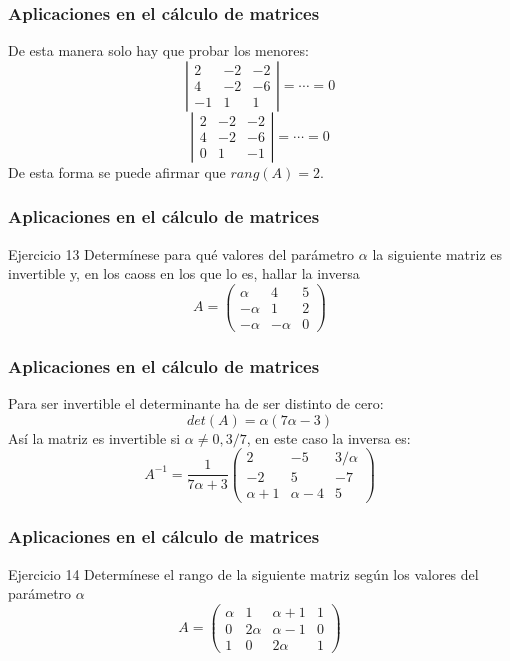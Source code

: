 \documentclass[12pt]{article}
\begin{document}
   \begin{frame}
  \frametitle{Aplicaciones en el c\'alculo de matrices}
De esta manera solo hay que probar los menores:
\[\left|\begin{array}{ccc}2 & -2 & -2 \\4 & -2 & -6 \\-1 & 1 & 1\end{array}\right|=\cdots=0\]
\[\left|\begin{array}{ccc}2 & -2 & -2 \\4 & -2 & -6 \\0 & 1 & -1\end{array}\right|=\cdots=0\]
De esta forma se puede afirmar que $rang(A) = 2$.
\end{frame}  


     \begin{frame}
  \frametitle{Aplicaciones en el c\'alculo de matrices}
     \begin{block}{Ejercicio 13}
Determ\'inese para qu\'e valores del par\'ametro $\alpha$ la siguiente matriz es invertible y, en los caoss en los que lo es, hallar la inversa
\[A = \left(\begin{array}{ccc} \alpha & 4 & 5 \\ -\alpha & 1 & 2 \\ -\alpha & -\alpha & 0 \end{array}\right)\]
\end{block}
\end{frame} 



     \begin{frame}
  \frametitle{Aplicaciones en el c\'alculo de matrices}
Para ser invertible el determinante ha de ser distinto de cero:
\[det(A) = \alpha(7\alpha-3)\]
As\'i la matriz es invertible si $\alpha \neq 0, 3/7$,  en este caso la inversa es: 
\[A^{-1} = \frac{1}{7\alpha+3} \left(\begin{array}{ccc} 2 & -5 & 3/\alpha \\ -2 & 5 & -7 \\ \alpha+1 & \alpha-4 & 5 \end{array}\right) \]
\end{frame} 


     \begin{frame}
  \frametitle{Aplicaciones en el c\'alculo de matrices}
     \begin{block}{Ejercicio 14}
Determ\'inese el rango de la siguiente matriz seg\'un los valores del par\'ametro $\alpha$
\[A = \left(\begin{array}{cccc} \alpha & 1 & \alpha+1 & 1 \\ 0& 2\alpha & \alpha-1 & 0 \\ 1&0 & 2\alpha & 1 \end{array}\right)\]
\end{block}
\end{frame} 
\end{document}
